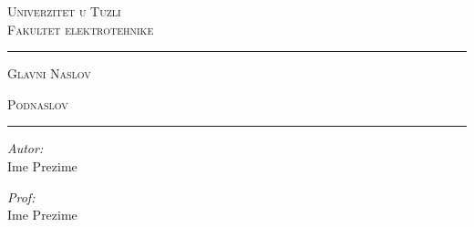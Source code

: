 \documentclass[12pt,a4paper]{report}
\newcommand\myhlinewotikz{\noindent\rule[.35em]{0.95\linewidth}{.4pt}\par}
\begin{document}
\begin{titlepage}
\center

\begin{flushleft} \large
\textsc{\Large{Univerzitet u Tuzli\\Fakultet elektrotehnike}}
\end{flushleft}

\myhlinewotikz
\textsc{\LARGE{Glavni Naslov}}\par
\vspace{3mm}
\textsc{\LARGE{Podnaslov}}\par
\myhlinewotikz

\noindent
\begin{minipage}{0.5\textwidth}
\begin{flushleft} \large
\emph{Autor:}\\
Ime Prezime
\end{flushleft}
\end{minipage}%
\begin{minipage}{0.5\textwidth}
\begin{flushright} \large
\emph{Prof:} \\
Ime Prezime
\end{flushright}
\end{minipage}

\end{titlepage}

\lipsum[3-100]

\label{LastPage}
\end{document}
